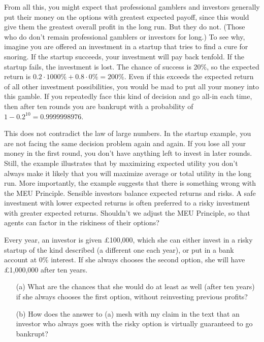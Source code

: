 From all this, you might expect that professional gamblers and investors
generally put their money on the options with greatest expected payoff, since
this would give them the greatest overall profit in the long run. But they do
not. (Those who do don't remain professional gamblers or investors for long.)
To see why, imagine you are offered an investment in a startup that tries to
find a cure for snoring. If the startup succeeds, your investment will pay back
tenfold. If the startup fails, the investment is lost. The chance of success is
20\%, so the expected return is $0.2 \cdot 1000\% + 0.8 \cdot 0\% = 200\%$. Even
if this exceeds the expected return of all other investment possibilities, you
would be mad to put all your money into this gamble. If you repeatedly face this
kind of decision and go all-in each time, then after ten rounds you are bankrupt
with a probability of $1-0.2^{10} = 0.9999998976$.%

This does not contradict the law of large numbers. In the startup example, you
are not facing the same decision problem again and again. If you lose all your
money in the first round, you don't have anything left to invest in later
rounds. Still, the example illustrates that by maximizing expected utility you
don't always make it likely that you will maximize average or total utility in
the long run. More importantly, the example suggests that there is something
wrong with the MEU Principle. Sensible investors balance expected returns and
risks. A safe investment with lower expected returns is often preferred to a
risky investment with greater expected returns. Shouldn't we adjust the MEU
Principle, so that agents can factor in the riskiness of their options?

\begin{exercise}{2}
  Every year, an investor is given £100,000, which she can either invest
  in a risky startup of the kind described (a different one
  each year), or put in a bank account at 0\% interest. If she always
  chooses the second option, she will have £1,000,000 after ten years.
  \begin{enumerate}
  \item[(a)] What are the chances that she would do at least as well
    (after ten years) if she always chooses the first option, without
    reinvesting previous profits?
  \item[(b)] How does the answer to (a) mesh with my claim in the text
    that an investor who always goes with the risky option is
    virtually guaranteed to go bankrupt?
  \end{enumerate}
\end{exercise}

